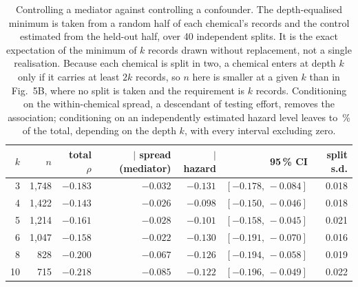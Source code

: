 \begin{table}[htbp]\centering\scriptsize\setlength{\tabcolsep}{2.4pt}
\caption{Controlling a mediator against controlling a confounder. The depth-equalised minimum is taken from a random half of each chemical's records and the control estimated from the held-out half, over 40 independent splits. It is the exact expectation of the minimum of $k$ records drawn without replacement, not a single realisation. Because each chemical is split in two, a chemical enters at depth $k$ only if it carries at least $2k$ records, so $n$ here is smaller at a given $k$ than in Fig.~5B, where no split is taken and the requirement is $k$ records. Conditioning on the within-chemical spread, a descendant of testing effort, removes the association; conditioning on an independently estimated hazard level leaves \hazShareLo{} to \hazShareHi{}\,\% of the total, depending on the depth $k$, with every interval excluding zero.}
\label{tab:s5}
\begin{tabular}{rrrrrrr}\toprule
$k$ & $n$ & total $\rho$ & $\mid$ spread (mediator) & $\mid$ hazard & 95\,\% CI & split s.d.\\\midrule
3 & 1,748 & $-0.183$ & $-0.032$ & $-0.131$ & $[-0.178,\,-0.084]$ & 0.018\\
4 & 1,422 & $-0.143$ & $-0.026$ & $-0.098$ & $[-0.150,\,-0.046]$ & 0.018\\
5 & 1,214 & $-0.161$ & $-0.028$ & $-0.101$ & $[-0.158,\,-0.045]$ & 0.021\\
6 & 1,047 & $-0.158$ & $-0.022$ & $-0.130$ & $[-0.191,\,-0.070]$ & 0.016\\
8 & 828 & $-0.200$ & $-0.067$ & $-0.126$ & $[-0.194,\,-0.058]$ & 0.019\\
10 & 715 & $-0.218$ & $-0.085$ & $-0.122$ & $[-0.196,\,-0.049]$ & 0.022\\
\bottomrule\end{tabular}\end{table}
